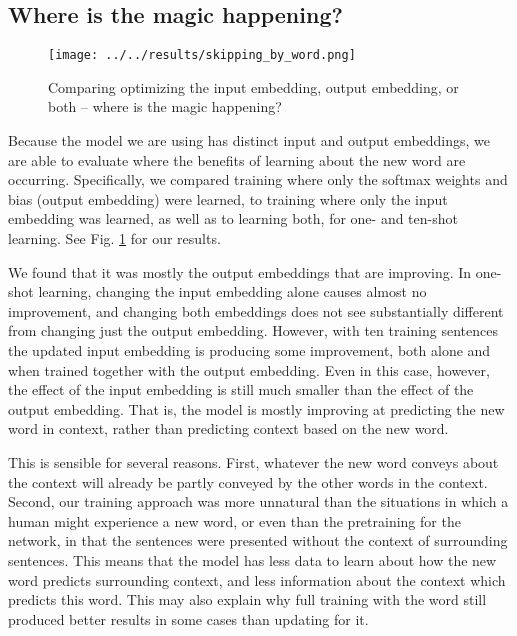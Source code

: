 \documentclass{article}
\begin{document}
\subsection{Where is the magic happening?}
\begin{figure}
\centering
\texttt{[image: ../../results/skipping\_by\_word.png]}
\caption{Comparing optimizing the input embedding, output embedding, or both -- where is the magic happening?}
\label{skipping_results}
\end{figure}
Because the model we are using has distinct input and output embeddings, we are able to evaluate where the benefits of learning about the new word are occurring. Specifically, we compared training where only the softmax weights and bias (output embedding) were learned, to training where only the input embedding was learned, as well as to learning both, for one- and ten-shot learning. See Fig. \ref{skipping_results} for our results.\par
We found that it was mostly the output embeddings that are improving. In one-shot learning, changing the input embedding alone causes almost no improvement, and changing both embeddings does not see substantially different from changing just the output embedding. However, with ten training sentences the updated input embedding is producing some improvement, both alone and when trained together with the output embedding. Even in this case, however, the effect of the input embedding is still much smaller than the effect of the output embedding. That is, the model is mostly improving at predicting the new word in context, rather than predicting context based on the new word. \par 
This is sensible for several reasons. First, whatever the new word conveys about the context will already be partly conveyed by the other words in the context. Second, our training approach was more unnatural than the situations in which a human might experience a new word, or even than the pretraining for the network, in that the sentences were presented without the context of surrounding sentences. This means that the model has less data to learn about how the new word predicts surrounding context, and less information about the context which predicts this word. This may also explain why full training with the word still produced better results in some cases than updating for it.\par
\end{document}
